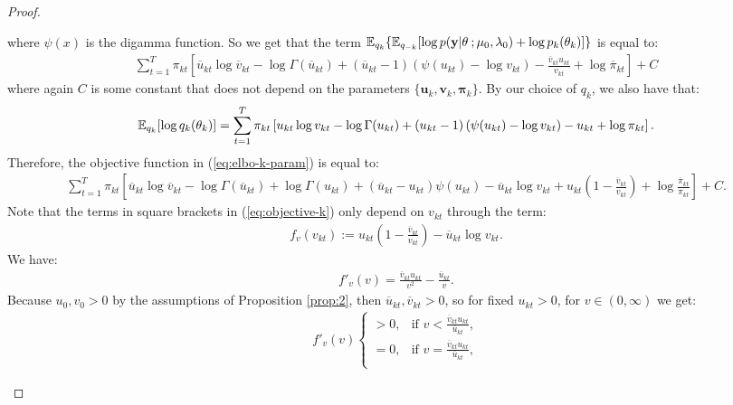 \begin{proof}
\begin{enumerate}[label=\roman*.]
where $\psi(x)$ is the digamma function. So we get that the term $\mathbb{E}_{q_k}\{\mathbb{E}_{q_{-k}}[\log p(\mathbf{y}| \theta\:; \mu_0,\lambda_0)+\log p_k(\theta_k)]\}$ is equal to:
\begin{align*}
    \sum_{t=1}^T \pi_{kt}\left[ \overline{u}_{kt} \log \overline{v}_{kt} -  \log\Gamma(\overline{u}_{kt}) + \left(\overline{u}_{kt} -1\right)(\psi(u_{kt}) - \log v_{kt}) - \frac{\overline{v}_{kt} u_{kt}}{v_{kt}} + \log \overline{\pi}_{kt}\right] + C
\end{align*}
where again $C$ is some constant that does not depend on the parameters $\{\mathbf{u}_k, \mathbf{v}_k, \pmb{\pi}_k\}$. By our choice of $q_k$, we also have that:
\begin{align*}
    \mathbb{E}_{q_k}[\log q_k(\theta_k)] = \sum_{t=1}^T \pi_{kt}\left[ u_{kt} \log v_{kt} -  \log\Gamma(u_{kt}) + \left(u_{kt} -1\right)(\psi(u_{kt}) - \log v_{kt}) - u_{kt} + \log \pi_{kt}\right].
\end{align*}
Therefore, the objective function in (\ref{eq:elbo-k-param}) is equal to:
\small
\begin{align}
    \sum_{t=1}^T \pi_{kt}\left[ \overline{u}_{kt} \log \overline{v}_{kt} - \log\Gamma(\overline{u}_{kt}) + \log\Gamma(u_{kt}) + \left(\overline{u}_{kt} -u_{kt}\right)\psi(u_{kt}) - \overline{u}_{kt} \log v_{kt} + u_{kt}\left(1 - \frac{\overline{v}_{kt} }{v_{kt}}\right) + \log \frac{\overline{\pi}_{kt}}{\pi_{kt}}\right] +C.\label{eq:objective-k}
\end{align}
\normalsize
Note that the terms in square brackets in (\ref{eq:objective-k}) only depend on $v_{kt}$ through the term: 
\begin{align*}
     f_v(v_{kt}) := u_{kt}\left(1- \frac{\overline{v}_{kt} }{v_{kt}}\right) - \overline{u}_{kt} \log v_{kt}.
\end{align*}
We have:
\begin{align*}
    f'_v(v) = \frac{\overline{v}_{kt} u_{kt}}{v^2} -\frac{\overline{u}_{kt}}{v}.
\end{align*}
Because $u_0, v_0 > 0$ by the assumptions of Proposition \ref{prop:2}, then $\overline{u}_{kt},\overline{v}_{kt} > 0$, so for fixed $u_{kt} >0$, for $v\in(0,\infty)$ we get:
\begin{align*}f'_v(v)
    \begin{cases}
        > 0, & \text{if } v < \frac{\overline{v}_{kt} u_{kt}}{\overline{u}_{kt}}, \\ 
        = 0, & \text{if } v = \frac{\overline{v}_{kt} u_{kt}}{\overline{u}_{kt}}, \\  

\end{cases}
\end{align*}
\end{enumerate}
\end{proof}
